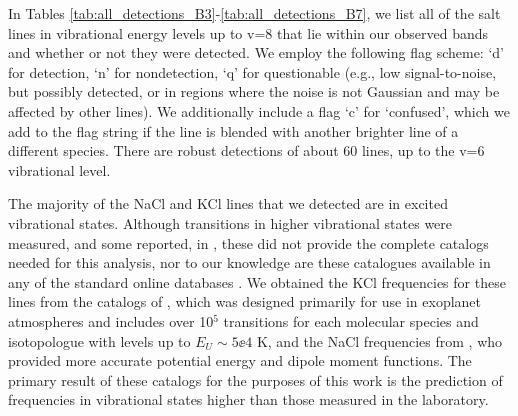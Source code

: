 \documentclass[twocolumn]{aastex62}
\newcommand{\rlp}[1]{\textcolor{blue!65!black}{\textbf{[RLP: #1]}}}
\newcommand{\ag}[1]{\textcolor{red!65!black}{\textbf{[AG: #1]}}}
\begin{document}
In Tables \ref{tab:all_detections_B3}-\ref{tab:all_detections_B7}, we list all
of the salt lines in vibrational energy levels up to v=8 that lie within our
observed bands and whether or not they were detected.  We employ the following
flag scheme: `d' for detection, `n' for nondetection, `q' for questionable
(e.g., low signal-to-noise, but possibly detected, or in regions where the
noise is not Gaussian and may be affected by other lines).  We additionally
include a flag `c' for `confused', which we add to the flag string if the line
is blended with another brighter line of a different species.  There are robust
detections of about 60 lines, up to the v=6 vibrational level.

The majority of the NaCl and KCl lines that we detected are in excited
vibrational states.  Although transitions in higher vibrational states were
measured, and some reported, in \citet{Caris2004a}, these did not provide the
complete catalogs needed for this analysis, nor to our knowledge are these
catalogues available in any of the standard online databases \citep[i.e., CDMS,
SLAIM, JPL;][]{Muller2005a,Lovas2005a,Pickett1998a}.  We obtained the KCl
frequencies for these lines from the catalogs of \citet{Barton2014a}, which was
designed primarily for use in exoplanet atmospheres and includes over 10$^5$
transitions for each molecular species and isotopologue with levels up to
$E_U\sim5\ee{4}$ K, and the NaCl frequencies from \citet{Cabezas2016a}, who
provided more accurate potential energy and dipole moment functions. The
primary result of these catalogs for the purposes of this work is the
prediction of frequencies in vibrational states higher than those measured in
the laboratory. 


\end{document}
